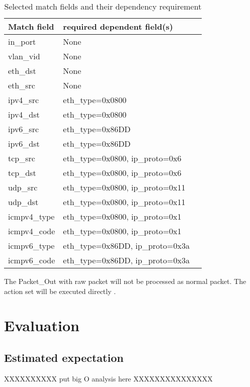 \begin{table}[H]
\centering
\caption{Selected match fields and their dependency requirement}
\begin{tabular}{|l|p{4cm}|p{8cm}}
\hline Match field & required dependent field(s) \\
\hline in\_port & None \\
\hline vlan\_vid & None \\
\hline eth\_dst & None \\
\hline eth\_src & None \\
\hline ipv4\_src & eth\_type=0x0800 \\
\hline ipv4\_dst & eth\_type=0x0800 \\
\hline ipv6\_src & eth\_type=0x86DD \\ 
\hline ipv6\_dst & eth\_type=0x86DD \\
\hline tcp\_src & eth\_type=0x0800, ip\_proto=0x6 \\
\hline tcp\_dst & eth\_type=0x0800, ip\_proto=0x6 \\
\hline udp\_src & eth\_type=0x0800, ip\_proto=0x11 \\
\hline udp\_dst & eth\_type=0x0800, ip\_proto=0x11 \\
\hline icmpv4\_type & eth\_type=0x0800, ip\_proto=0x1 \\
\hline icmpv4\_code & eth\_type=0x0800, ip\_proto=0x1 \\
\hline icmpv6\_type & eth\_type=0x86DD, ip\_proto=0x3a \\
\hline icmpv6\_code & eth\_type=0x86DD, ip\_proto=0x3a \\
\hline 
\end{tabular}
\label{table:selected_match_fields}
\end{table}

The Packet\_Out with raw packet will not be processed as normal packet. The action set will be executed directly \cite{PACKETOUT}.

\section{Evaluation}

\subsection{Estimated expectation}
XXXXXXXXXX put big O analysis here XXXXXXXXXXXXXXX
